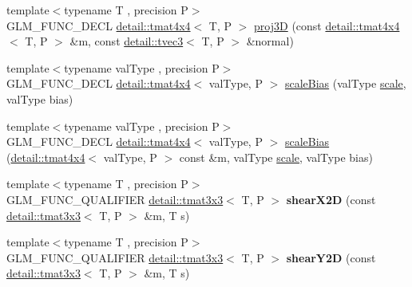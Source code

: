 \begin{DoxyCompactItemize}
\item 
{\footnotesize template$<$typename T , precision P$>$ }\\G\+L\+M\+\_\+\+F\+U\+N\+C\+\_\+\+D\+E\+CL \hyperlink{structglm_1_1detail_1_1tmat4x4}{detail\+::tmat4x4}$<$ T, P $>$ \hyperlink{group__gtx__transform2_ga70a21b940727b94060fd3826eeacb048}{proj3D} (const \hyperlink{structglm_1_1detail_1_1tmat4x4}{detail\+::tmat4x4}$<$ T, P $>$ \&m, const \hyperlink{structglm_1_1detail_1_1tvec3}{detail\+::tvec3}$<$ T, P $>$ \&normal)
\item 
{\footnotesize template$<$typename val\+Type , precision P$>$ }\\G\+L\+M\+\_\+\+F\+U\+N\+C\+\_\+\+D\+E\+CL \hyperlink{structglm_1_1detail_1_1tmat4x4}{detail\+::tmat4x4}$<$ val\+Type, P $>$ \hyperlink{group__gtx__transform2_ga0a387ae1a7fd1a2ca451ac47833ee3e2}{scale\+Bias} (val\+Type \hyperlink{group__gtc__matrix__transform_gabd40959f269abd16c256a4f59ab03d62}{scale}, val\+Type bias)
\item 
{\footnotesize template$<$typename val\+Type , precision P$>$ }\\G\+L\+M\+\_\+\+F\+U\+N\+C\+\_\+\+D\+E\+CL \hyperlink{structglm_1_1detail_1_1tmat4x4}{detail\+::tmat4x4}$<$ val\+Type, P $>$ \hyperlink{group__gtx__transform2_gae733630f90c53ca3dce8daf50f25d6ab}{scale\+Bias} (\hyperlink{structglm_1_1detail_1_1tmat4x4}{detail\+::tmat4x4}$<$ val\+Type, P $>$ const \&m, val\+Type \hyperlink{group__gtc__matrix__transform_gabd40959f269abd16c256a4f59ab03d62}{scale}, val\+Type bias)
\item 
{\footnotesize template$<$typename T , precision P$>$ }\\G\+L\+M\+\_\+\+F\+U\+N\+C\+\_\+\+Q\+U\+A\+L\+I\+F\+I\+ER \hyperlink{structglm_1_1detail_1_1tmat3x3}{detail\+::tmat3x3}$<$ T, P $>$ {\bfseries shear\+X2D} (const \hyperlink{structglm_1_1detail_1_1tmat3x3}{detail\+::tmat3x3}$<$ T, P $>$ \&m, T s)\hypertarget{namespaceglm_a0a502e4d2ae72ac76b84b9c13add616a}{}\label{namespaceglm_a0a502e4d2ae72ac76b84b9c13add616a}

\item 
{\footnotesize template$<$typename T , precision P$>$ }\\G\+L\+M\+\_\+\+F\+U\+N\+C\+\_\+\+Q\+U\+A\+L\+I\+F\+I\+ER \hyperlink{structglm_1_1detail_1_1tmat3x3}{detail\+::tmat3x3}$<$ T, P $>$ {\bfseries shear\+Y2D} (const \hyperlink{structglm_1_1detail_1_1tmat3x3}{detail\+::tmat3x3}$<$ T, P $>$ \&m, T s)\hypertarget{namespaceglm_a8727c1c13f2171fd90c75f3a1bdaf95d}{}\label{namespaceglm_a8727c1c13f2171fd90c75f3a1bdaf95d}


\end{DoxyCompactItemize}
